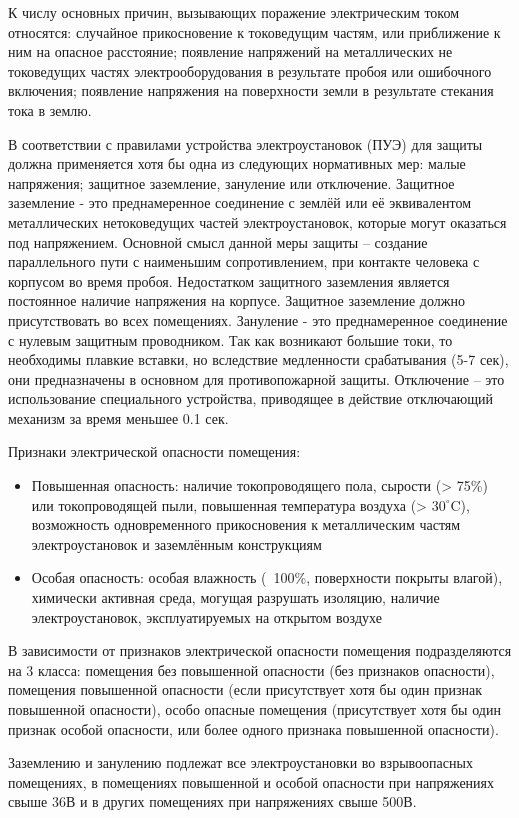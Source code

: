 \documentclass[12pt,a4paper]{report}
\begin{document}
К числу основных причин, вызывающих поражение электрическим током относятся: случайное прикосновение к токоведущим частям, или приближение к ним на опасное расстояние; появление напряжений на металлических не токоведущих частях электрооборудования в результате пробоя или ошибочного включения; появление напряжения на поверхности земли в результате стекания тока в землю.

В соответствии с правилами устройства электроустановок (ПУЭ) для защиты должна применяется хотя бы одна из следующих нормативных мер: малые напряжения; защитное заземление, зануление или отключение. Защитное заземление - это преднамеренное соединение с землёй или её эквивалентом металлических нетоковедущих частей электроустановок, которые могут оказаться под напряжением. Основной смысл данной меры защиты – создание параллельного пути с наименьшим сопротивлением, при контакте человека с корпусом во время пробоя. Недостатком защитного заземления является постоянное наличие напряжения на корпусе. Защитное заземление должно присутствовать во всех помещениях. Зануление - это преднамеренное соединение с нулевым защитным проводником. Так как возникают большие токи, то необходимы плавкие вставки, но вследствие медленности срабатывания (5-7 сек), они предназначены в основном для противопожарной защиты. Отключение – это использование специального устройства, приводящее в действие отключающий механизм за время меньшее 0.1 сек. 

Признаки электрической опасности помещения:
\begin{itemize}
\item Повышенная опасность: наличие токопроводящего пола, сырости (> 75\%) или токопроводящей пыли, повышенная температура воздуха (> $30^\circ$C), возможность одновременного прикосновения к металлическим частям электроустановок и заземлённым конструкциям
\item Особая опасность: особая влажность (~100\%, поверхности покрыты влагой), химически активная среда, могущая разрушать изоляцию, наличие электроустановок, эксплуатируемых на открытом воздухе
\end{itemize}
В зависимости от признаков электрической опасности помещения подразделяются на 3 класса: помещения без повышенной опасности (без признаков опасности), помещения повышенной опасности (если присутствует хотя бы один признак повышенной опасности), особо опасные помещения (присутствует хотя бы один признак особой опасности, или более одного признака повышенной опасности).

Заземлению и занулению подлежат все электроустановки во взрывоопасных помещениях, в помещениях повышенной и особой опасности при напряжениях свыше 36В и в других помещениях при напряжениях свыше 500В.
\end{document}
